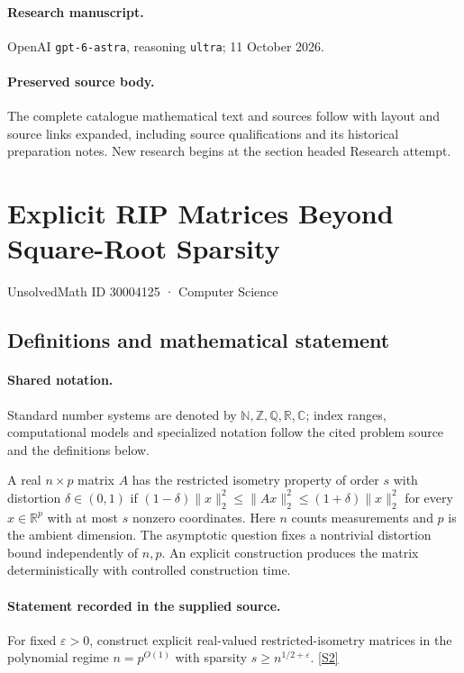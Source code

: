 \documentclass[11pt]{article}
\begin{document}
\paragraph{Research manuscript.} OpenAI \texttt{gpt-6-astra}, reasoning \texttt{ultra}; 11 October 2026.
\paragraph{Preserved source body.} The complete catalogue mathematical text and sources follow with layout and source links expanded, including source qualifications and its historical preparation notes. New research begins at the section headed Research attempt.

\section{Explicit RIP Matrices Beyond Square-Root Sparsity}\label{30004125}
{\small UnsolvedMath ID 30004125 · Computer Science}
\subsection{Definitions and mathematical statement}

\paragraph{Shared notation.}Standard number systems are denoted by $\mathbb N,\mathbb Z,\mathbb Q,\mathbb R,\mathbb C$; index ranges, computational models and specialized notation follow the cited problem source and the definitions below.


A real $n\times p$ matrix $A$ has the restricted isometry property of order $s$ with distortion $\delta\in(0,1)$ if $(1-\delta)\|x\|_2^2\leq\|Ax\|_2^2\leq(1+\delta)\|x\|_2^2$ for every $x\in\mathbb R^p$ with at most $s$ nonzero coordinates. Here $n$ counts measurements and $p$ is the ambient dimension. The asymptotic question fixes a nontrivial distortion bound independently of $n,p$. An explicit construction produces the matrix deterministically with controlled construction time.
\paragraph{Statement recorded in the supplied source.}
For fixed $\varepsilon>0$, construct explicit real-valued restricted-isometry matrices in the polynomial regime $n=p^{O(1)}$ with sparsity $s\geq n^{1/2+\varepsilon}$. \href{https://doi.org/10.4171/owr/2019/19}{[S2]}
\end{document}
